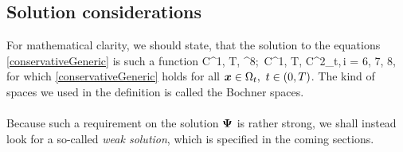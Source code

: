 \subsection{Solution considerations}
For mathematical clarity, we should state, that the solution to the equations \ref{conservativeGeneric} is such a function
\be
\label{HardSln} \mrPsi\in C^1\lo{}, T\ro, ^8\ro;\ \mrPsii\in C^1\lo{}, T\ro, C^2\lo\Omega_{t}\ro\ro,\,i = 6, 7, 8,
\ee
for which \ref{conservativeGeneric} holds for all $\mbox{\boldmath $x$}\in\Omega_t,\ t\in\left( 0, T\right)$. The kind of spaces we used in the definition is called the Bochner spaces.
\paragraph{}
Because such a requirement on the solution $\mathrm{\mathbf{\Psi}}$ is rather strong, we shall instead look for a so-called \textit{weak solution}, which is specified in the coming sections.